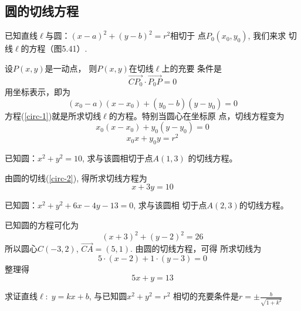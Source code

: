 \subsection{圆的切线方程}
已知直线$\ell$与圆：$(x-a)^2+(y-b)^2=r^2$相切于
点$P_0(x_0,y_0)$, 我们来求
切线$\ell$的方程（图5.41）.
\begin{figure}[htp]
    \centering
{}
    \caption{}
\end{figure}


设$P(x,y)$是一动点，
则$P(x,y)$在切线$\ell$上的充要
条件是
\[\Vec{CP_0}\cdot \Vec{P_0P}=0\]
用坐标表示，即为
\begin{equation}\label{circ-1}
    (x_0-a)(x-x_0)+(y_0-b)(y-y_0)=0
\end{equation}
方程(\ref{circ-1})就是所求切线$\ell$的方程。特别当圆心在坐标原
点，切线方程变为
\[x_0(x-x_0)+y_0(y-y_0)=0\]
\begin{equation}\label{circ-2}
    x_0x+y_0y=r^2
\end{equation}

\begin{example}
已知圆：$x^2+y^2=10$, 求与该圆相切于点$A(1,3)$
的切线方程。
\end{example}
    
\begin{solution}
由圆的切线(\ref{circ-2}), 得所求切线方程为
\[x+3y=10\]
\end{solution}

\begin{example}
已知圆：$x^2+y^2+6x-4y-13=0$, 求与该圆相
    切于点$A(2,3)$的切线方程。
\end{example}

\begin{solution}
已知圆的方程可化为
\[(x+3)^2+(y-2)^2=26\]
    所以圆心$C(-3,2)$, $\Vec{CA}=(5,1)$. 由圆的切线方程，可得
    所求切线为
\[    5\cdot (x-2)+1\cdot (y-3)=0\]
    整理得
\[    5x+y=13\]
\end{solution}

\begin{example}
    求证直线$\ell:\; y=kx+b$, 与已知圆$x^2+y^2=r^2$
相切的充要条件是$r=\pm\frac{b}{\sqrt{1+k^2}}$
\end{example}

